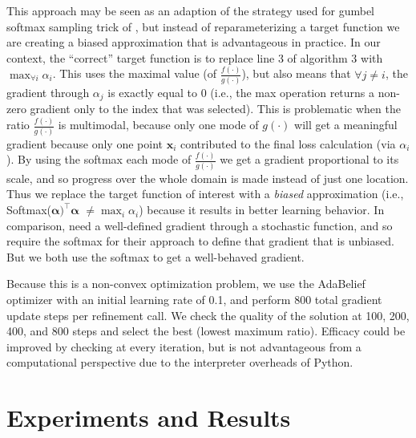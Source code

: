 \documentclass{ecai}  %
\begin{document}
This approach may be seen as an adaption of the strategy used for gumbel softmax sampling trick of \cite{Jang_Gu_Poole_2017}, but instead of reparameterizing a target function we are creating a biased approximation that is advantageous in practice. 
In our context, the ``correct'' target function is to replace line 3 of algorithm 3 with $\max_{\forall i} \alpha_i$. This uses the maximal value (of $\frac{f(\cdot)}{g(\cdot)}$), but also means that $\forall j \neq i$, the gradient through $\alpha_j$ is exactly equal to 0 (i.e., the max operation returns a non-zero gradient only to the index that was selected).
This is problematic when the ratio $\frac{f(\cdot)}{g(\cdot)}$ is multimodal, because only one mode of $g(\cdot)$ will get a meaningful gradient because only one point $\boldsymbol{x}_i$ contributed to the final loss calculation (via $\alpha_i$). By using the softmax each mode of $\frac{f(\cdot)}{g(\cdot)}$ we get a gradient proportional to its scale, and so progress over the whole domain is made instead of just one location. Thus we replace the target function of interest with a \textit{biased} approximation (i.e., Softmax($\boldsymbol{\alpha})^\top \boldsymbol{\alpha}$ $\neq \max_i \alpha_i$) because it results in better learning behavior. In comparison, \cite{Jang_Gu_Poole_2017} need a well-defined gradient through a stochastic function, and so require the softmax for their approach to define that gradient that is unbiased. But we both use the softmax to get a well-behaved gradient. 

Because this is a non-convex optimization problem, we use the AdaBelief\cite{zhuang2020adabelief} optimizer with an initial learning rate of 0.1, and perform 800 total gradient update steps per refinement call. We check the quality of the solution at 100, 200, 400, and 800 steps and select the best (lowest maximum ratio). Efficacy could be improved by checking at every iteration, but is not advantageous from a computational perspective due to the interpreter overheads of Python. 

\section{Experiments and Results} \label{sec:results}
\end{document}
